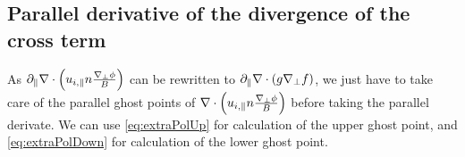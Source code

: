 \subsection{Parallel derivative of the divergence of the cross term}
%
As $\partial_\|\nabla\cdot \left( u_{i,\|}n \frac{\nabla_\perp \phi}{B}\right)$ can be rewritten to $\partial_\|\nabla\cdot(g\nabla_\perp f)$, we just have to take care of the parallel ghost points of $\nabla\cdot \left( u_{i,\|}n \frac{\nabla_\perp \phi}{B}\right)$ before taking the parallel derivate.
We can use \cref{eq:extraPolUp} for calculation of the upper ghost point, and \cref{eq:extraPolDown}  for calculation of the lower ghost point.
